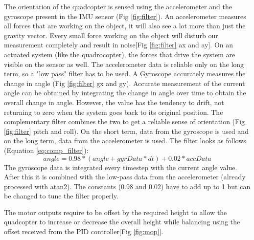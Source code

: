 \noindent
The orientation of the quadcopter is sensed using the accelerometer and the gyroscope present in the IMU sensor (Fig \ref{fig:filter}).
An accelerometer measures all forces that are working on the object, it will also see a lot more than just the gravity vector. Every small force working on the object will disturb our measurement completely and result in noise[Fig \ref{fig:filter} ax and ay]. On an actuated system (like the quadrocopter), the forces that drive the system are visible on the sensor as well. The accelerometer data is reliable only on the long term, so a "low pass" filter has to be used.
\newline \newline
A Gyroscope accurately measures the change in angle (Fig \ref{fig:filter} gx and gy). Accurate measurement of the current angle can be obtained by integrating the change in angle over time to obtain the overall change in angle. However, the value has the tendency to drift, not returning to zero when the system goes back to its original position. 
\newline \newline
The complementary filter combines the two to get a reliable sense of orientation (Fig \ref{fig:filter} pitch and roll). On the short term, data from the gyroscope is used and on the long term, data from the accelerometer is used. The filter looks as follows (Equation \ref{eq:comp_filter}):
\begin{equation}
angle = 0.98*(angle+gyrData*dt)+0.02*accData
\label{eq:comp_filter} 
\end{equation}
The gyroscope data is integrated every timestep with the current angle value. After this it is combined with the low-pass data from the accelerometer (already processed with atan2). The constants (0.98 and 0.02) have to add up to 1 but can be changed to tune the filter properly.

\noindent
The motor outputs require to be offset by the required height to allow the quadcopter to increase or decrease the overall height while balancing using the offset received from the PID controller[Fig \ref{fig:mop}].

